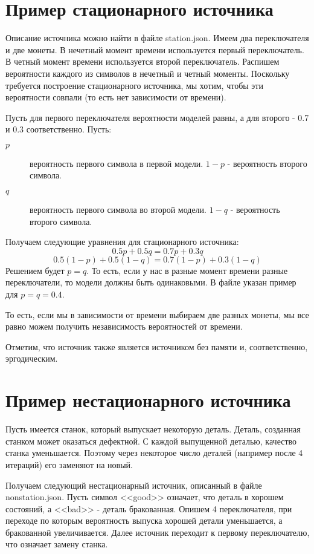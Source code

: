 \documentclass{article}
\begin{document}
	\section{Пример стационарного источника}
	
	Описание источника можно найти в файле station.json.
	Имеем два переключателя и две монеты.
	В нечетный момент времени используется первый переключатель.
	В четный момент времени используется второй переключатель.
	Распишем вероятности каждого из символов в нечетный и четный моменты. Поскольку требуется построение стационарного источника, мы хотим, чтобы эти вероятности совпали (то есть нет зависимости от времени).
	
	Пусть для первого переключателя вероятности моделей равны, а для второго - 0.7 и 0.3 соответственно.
	Пусть:
	\begin{description}
		\item[$p$] вероятность первого символа в первой модели. $1-p$ - вероятность второго символа.
		\item[$q$] вероятность первого символа во второй модели. $1-q$ - вероятность второго символа.
	\end{description}
	
	Получаем следующие уравнения для стационарного источника:
	\[0.5p + 0.5q=0.7p + 0.3q\]
	\[0.5(1-p)+0.5(1-q)=0.7(1-p)+0.3(1-q)\]
	Решением будет $p=q$. То есть, если у нас в разные момент времени разные переключатели, то модели должны быть одинаковыми. В файле указан пример для $p=q=0.4$.
	
	То есть, если мы в зависимости от времени выбираем две разных монеты, мы все равно можем получить независимость вероятностей от времени.
	
	Отметим, что источник также является источником без памяти и, соответственно, эргодическим.
	
	\section{Пример нестационарного источника}
	
	Пусть имеется станок, который выпускает некоторую деталь. Деталь, созданная станком может оказаться дефектной. С каждой выпущенной деталью, качество станка уменьшается. Поэтому через некоторое число деталей (например после 4 итераций) его заменяют на новый.
	
	Получаем следующий нестационарный источник, описанный в файле nonstation.json.
	Пусть символ <<good>> означает, что деталь в хорошем состояний, а <<bad>> - деталь бракованная.
	Опишем 4 переключателя, при переходе по которым вероятность выпуска хорошей детали уменьшается, а бракованной увеличивается. Далее источник переходит к первому переключателю, что означает замену станка.
	
\end{document}
